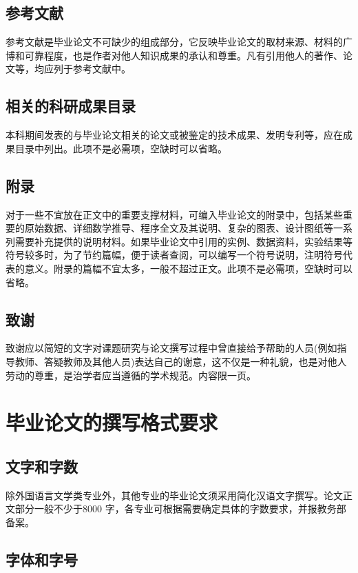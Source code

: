 \subsection{参考文献}

参考文献是毕业论文不可缺少的组成部分，它反映毕业论文的取材来源、材料的广博和可靠程度，也是作者对他人知识成果的承认和尊重。凡有引用他人的著作、论文等，均应列于参考文献中。

\subsection{相关的科研成果目录}

本科期间发表的与毕业论文相关的论文或被鉴定的技术成果、发明专利等，应在成果目录中列出。此项不是必需项，空缺时可以省略。

\subsection{附录}

对于一些不宜放在正文中的重要支撑材料，可编入毕业论文的附录中，包括某些重要的原始数据、详细数学推导、程序全文及其说明、复杂的图表、设计图纸等一系列需要补充提供的说明材料。如果毕业论文中引用的实例、数据资料，实验结果等符号较多时，为了节约篇幅，便于读者查阅，可以编写一个符号说明，注明符号代表的意义。附录的篇幅不宜太多，一般不超过正文。此项不是必需项，空缺时可以省略。

\subsection{致谢}

致谢应以简短的文字对课题研究与论文撰写过程中曾直接给予帮助的人员(例如指导教师、答疑教师及其他人员)表达自己的谢意，这不仅是一种礼貌，也是对他人劳动的尊重，是治学者应当遵循的学术规范。内容限一页。


\section{毕业论文的撰写格式要求}


\subsection{文字和字数}


除外国语言文学类专业外，其他专业的毕业论文须采用简化汉语文字撰写。论文正文部分一般不少于8000 字，各专业可根据需要确定具体的字数要求，并报教务部备案。

\subsection{字体和字号}

